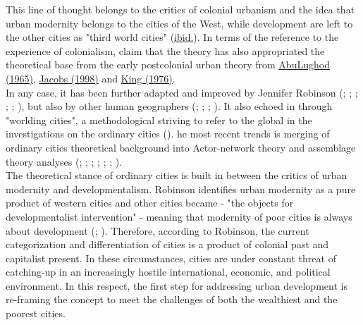 \documentclass[11pt]{report}
\begin{document}
This line of thought belongs to the critics of colonial urbanism and the idea that  urban  modernity belongs to the cities of the West, while development are left to the other cities as "third world cities" (\href{Robinson}{ibid.}).
In terms of the reference to the experience of colonialism, \href{Scott}{\citealt{scott_nature_2015}} claim that the theory has also appropriated the theoretical base from the early postcolonial urban theory from \href{Abu­Lughod????}{Abu­Lughod (1965)}, \href{Jacobs????}{Jacobs (1998)} and \href{King????}{King (1976)}.
\\

In any case, it has been further adapted and improved by Jennifer Robinson
(\href{Robinson}{\citealt{robinson_global_2002}}; \href{Robinson}{\citealt{robinson_ordinary_2006}}; \href{Robinson}{\citealt{robinson_cities_2011}}; \href{Robinson}{\citealt{robinson_urban_2013}}; \href{Robinson}{\citealt{robinson_comparative_2015}}; \href{Robinson}{\citealt{robinson_thinking_2016}}),
but also by other human geographers
(\href{Amin}{\citealt{amin_ordinary_1997}}; \href{Roy}{\citealt{roy_urbanisms_2011}}; \href{Roy}{\cite{RoyAndOng2011????}}; \href{Parnell}{\citealt{parnell_retheorizing_2012}}).
It also echoed in through "worlding cities", a methodological striving to refer to the global in the investigations on the ordinary cities (\href{Roy}{\cite{RoyAndOng2011}}). 
he most recent trends is merging of ordinary cities theoretical background into Actor-network theory and assemblage theory analyses
(\href{ONg}{\cite{OngANdCollier2004}}; \href{Robinson}{\cite{Robinson2004}};
\href{Sassen}{\cite{Sassen2008}}; \href{McFarlane}{\cite{McFarlane2010}}; \href{Farias}{\citealt{farias_introduction:_2011}}; \href{Rankin}{\citealt{rankin_assemblage_2011}};
\href{Scott}{\citealt{scott_nature_2015}}).
\\

The theoretical stance of ordinary cities is built in between the critics of urban modernity and developmentalism.
Robinson identifies urban modernity as a pure product of western cities and other cities became - "the objects for developmentalist intervention" - meaning that modernity of poor cities is always about development (\href{Robinson}{\citealt{robinson_global_2002}}; \href{Robinson}{\citealt{robinson_ordinary_2006}}).
Therefore, according to Robinson, the current categorization  and  differentiation  of  cities is a product of colonial past and capitalist present. 
In these circumstances, cities are under constant threat of catching-up in an increasingly hostile international, economic, and political environment. 
In this respect, the first step for addressing urban  development  is re-framing the concept to   meet  the challenges  of  both  the  wealthiest  and  the  poorest  cities.
\\
\end{document}
